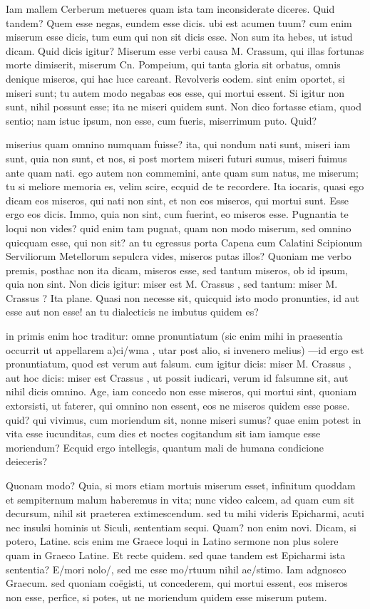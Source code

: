  Iam mallem Cerberum metueres quam ista tam inconsiderate diceres. Quid tandem? Quem esse negas, eundem esse dicis. ubi est acumen tuum? cum enim miserum esse dicis, tum eum qui non sit dicis esse. Non sum ita hebes, ut istud dicam. Quid dicis igitur? Miserum esse verbi causa M. Crassum, qui illas fortunas morte dimiserit, miserum Cn. Pompeium, qui tanta gloria sit orbatus, omnis denique miseros, qui hac luce careant. Revolveris eodem. sint enim oportet, si miseri sunt; tu autem modo negabas eos esse, qui mortui essent. Si igitur non sunt, nihil possunt esse; ita ne miseri quidem sunt. Non dico fortasse etiam, quod sentio; nam istuc ipsum, non esse, cum fueris, miserrimum puto. Quid?

 miserius quam omnino numquam fuisse? ita, qui nondum nati sunt, miseri iam sunt, quia non sunt, et nos, si post mortem miseri futuri sumus, miseri fuimus ante quam nati. ego autem non commemini, ante quam sum natus, me miserum; tu si meliore memoria es, velim scire, ecquid de te recordere. Ita iocaris, quasi ego dicam eos miseros, qui nati non sint, et non eos miseros, qui mortui sunt. Esse ergo eos dicis. Immo, quia non sint, cum fuerint, eo miseros esse. Pugnantia te loqui non vides? quid enim tam pugnat, quam non modo miserum, sed omnino quicquam esse, qui non sit? an tu egressus porta Capena cum Calatini Scipionum Serviliorum Metellorum sepulcra vides, miseros putas illos? Quoniam me verbo premis, posthac non ita dicam, miseros esse, sed tantum miseros, ob id ipsum, quia non sint. Non dicis igitur: miser est M. Crassus , sed tantum: miser M. Crassus ? Ita plane. Quasi non necesse sit, quicquid isto modo pronunties, id aut esse aut non esse! an tu dialecticis ne imbutus quidem es?

 in primis enim hoc traditur: omne pronuntiatum (sic enim mihi in praesentia occurrit ut appellarem a)ci/wma , utar post alio, si invenero melius) —id ergo est pronuntiatum, quod est verum aut falsum. cum igitur dicis: miser M. Crassus , aut hoc dicis: miser est Crassus , ut possit iudicari, verum id falsumne sit, aut nihil dicis omnino. Age, iam concedo non esse miseros, qui mortui sint, quoniam extorsisti, ut faterer, qui omnino non essent, eos ne miseros quidem esse posse. quid? qui vivimus, cum moriendum sit, nonne miseri sumus? quae enim potest in vita esse iucunditas, cum dies et noctes cogitandum sit iam iamque esse moriendum? Ecquid ergo intellegis, quantum mali de humana condicione deieceris?

 Quonam modo? Quia, si mors etiam mortuis miserum esset, infinitum quoddam et sempiternum malum haberemus in vita; nunc video calcem, ad quam cum sit decursum, nihil sit praeterea extimescendum. sed tu mihi videris Epicharmi, acuti nec insulsi hominis ut Siculi, sententiam sequi. Quam? non enim novi. Dicam, si potero, Latine. scis enim me Graece loqui in Latino sermone non plus solere quam in Graeco Latine. Et recte quidem. sed quae tandem est Epicharmi ista sententia? E/mori nolo/, sed me esse mo/rtuum nihil ae/stimo. Iam adgnosco Graecum. sed quoniam coëgisti, ut concederem, qui mortui essent, eos miseros non esse, perfice, si potes, ut ne moriendum quidem esse miserum putem.

